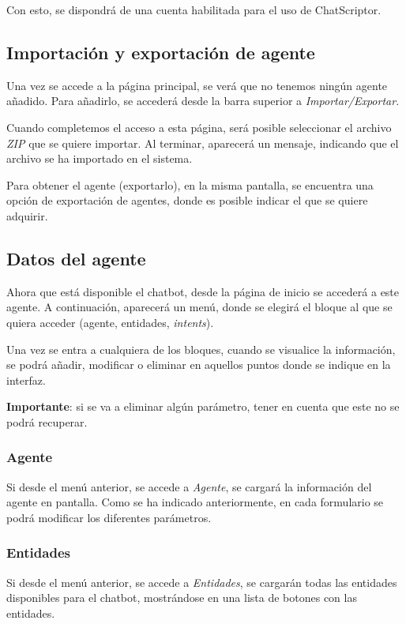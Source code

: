 Con esto, se dispondrá de una cuenta habilitada para el uso de ChatScriptor.

\subsection{Importación y exportación de agente}
Una vez se accede a la página principal, se verá que no tenemos ningún agente añadido. Para añadirlo, se accederá desde la barra superior a \textit{Importar/Exportar}.

Cuando completemos el acceso a esta página, será posible seleccionar el archivo \textit{ZIP} que se quiere importar. Al terminar, aparecerá un mensaje, indicando que el archivo se ha importado en el sistema.

Para obtener el agente (exportarlo), en la misma pantalla, se encuentra una opción de exportación de agentes, donde es posible indicar el que se quiere adquirir.

\subsection{Datos del agente}
Ahora que está disponible el chatbot, desde la página de inicio se accederá a este agente. A continuación, aparecerá un menú, donde se elegirá el bloque al que se quiera acceder (agente, entidades, \textit{intents}).

Una vez se entra a cualquiera de los bloques, cuando se visualice la información, se podrá añadir, modificar o eliminar en aquellos puntos donde se indique en la interfaz.

\textbf{Importante}: si se va a eliminar algún parámetro, tener en cuenta que este no se podrá recuperar.

\subsubsection{Agente}
Si desde el menú anterior, se accede a \textit{Agente}, se cargará la información del agente en pantalla.
Como se ha indicado anteriormente, en cada formulario se podrá modificar los diferentes parámetros.

\subsubsection{Entidades}
Si desde el menú anterior, se accede a \textit{Entidades}, se cargarán todas las entidades disponibles para el chatbot, mostrándose en una lista de botones con las entidades.

